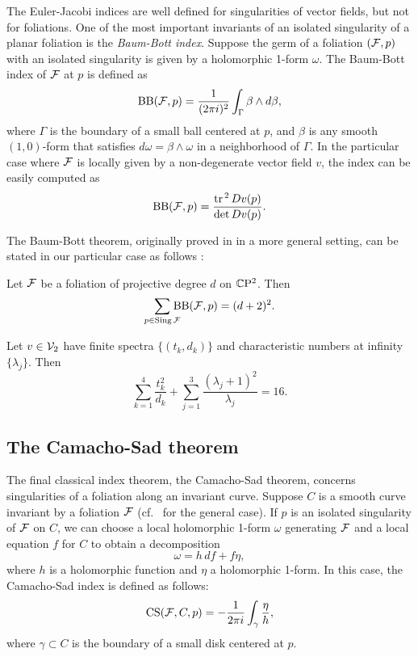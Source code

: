 \documentclass[phd,tocprelim]{cornell}
\begin{document}
The Euler-Jacobi indices are well defined for singularities of vector fields, but not for foliations. One of the most important invariants of an isolated singularity of a planar foliation
is the \textit{Baum-Bott index}. Suppose the germ of a foliation $(\mathcal{F},p)$ with an isolated singularity is given by a holomorphic 1-form $\omega$. The Baum-Bott index of $\mathcal{F}$ at $p$ is defined as
 \[ \operatorname{BB}({\mathcal{F}},{p}) = \frac{1}{(2\pi i)^2}\int_{\Gamma} \beta\wedge d\beta, \]
where $\Gamma$ is the boundary of a small ball centered at $p$, and $\beta$ is any smooth $(1,0)$-form that satisfies $d\omega=\beta\wedge\omega$ in a neighborhood of $\Gamma$. In the particular case where $\mathcal{F}$ is locally given by a non-degenerate vector field $v$, the index can be easily computed as
 \[ \operatorname{BB}({\mathcal{F}},{p}) = \frac{\operatorname{tr}^{\,2} Dv(p)}{\det Dv(p)}. \]
 
The Baum-Bott theorem, originally proved in \cite{BaumBott1970} in a more general setting, can be stated in our particular case as follows \cite{Brunella2004b}:

\begin{theorem}
 Let $\mathcal{F}$ be a foliation of projective degree $d$ on $\mathbb{C}\mathrm{P}^2$. Then 
  \[ \sum_{p\in\operatorname{Sing}\mathcal{F}} \hspace{-8pt}\operatorname{BB}({\mathcal{F}},{p}) = (d+2)^2. \]
\end{theorem}

\begin{corollary}
 Let $v\in\mathcal{V}_2$ have finite spectra $\{(t_k,d_k)\}$ and characteristic numbers at infinity $\{\lambda_j\}$. Then
  \begin{equation}
   \sum_{k=1}^4\frac{t_k^2}{d_k} + \sum_{j=1}^3 \frac{(\lambda_j+1)^2}{\lambda_j} = 16 . \label{eq:BB}
  \end{equation}

\end{corollary}

 
\subsection{The Camacho-Sad theorem}

The final classical index theorem, the Camacho-Sad theorem, concerns singularities of a foliation along an invariant curve. Suppose $C$ is a smooth curve invariant by a foliation $\mathcal{F}$ (cf.~\cite{Brunella2004b} for the general case). If $p$ is an isolated singularity of $\mathcal{F}$ on $C$, we can choose a local holomorphic 1-form $\omega$ generating $\mathcal{F}$ and a local equation $f$ for $C$ to obtain a decomposition 
 \[ \omega = h\,df + f\eta, \]
where $h$ is a holomorphic function and $\eta$ a holomorphic 1-form. In this case, the Camacho-Sad index is defined as follows:
 \[ \operatorname{CS}({\mathcal{F}},{C},{p}) = -\frac{1}{2\pi i}\int_{\gamma} \frac{\eta}{h}, \]
where $\gamma\subset C$ is the boundary of a small disk centered at $p$.
\end{document}

